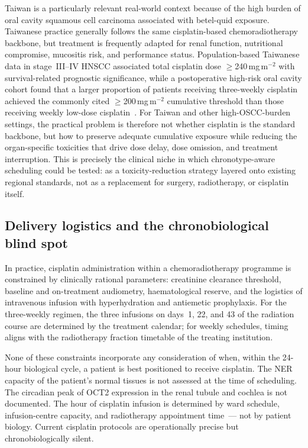 \documentclass[preprint,review,12pt]{elsarticle}
\begin{document}
Taiwan is a particularly relevant real-world context because of the high
burden of oral cavity squamous cell carcinoma associated with betel-quid
exposure.  Taiwanese practice generally follows the same cisplatin-based
chemoradiotherapy backbone, but treatment is frequently adapted for renal
function, nutritional compromise, mucositis risk, and performance status.
Population-based Taiwanese data in stage~III--IV HNSCC associated total
cisplatin dose $\geq$240\,mg\,m$^{-2}$ with survival-related prognostic
significance, while a postoperative high-risk oral cavity cohort found that
a larger proportion of patients receiving three-weekly cisplatin achieved
the commonly cited $\geq$200\,mg\,m$^{-2}$ cumulative threshold than those
receiving weekly low-dose cisplatin~\cite{Chang2017, Tsan2012}.  For Taiwan
and other high-OSCC-burden settings, the practical problem is therefore not
whether cisplatin is the standard backbone, but how to preserve adequate
cumulative exposure while reducing the organ-specific toxicities that drive
dose delay, dose omission, and treatment interruption.  This is precisely
the clinical niche in which chronotype-aware scheduling could be tested:
as a toxicity-reduction strategy layered onto existing regional standards,
not as a replacement for surgery, radiotherapy, or cisplatin itself.

\subsection{Delivery logistics and the chronobiological blind spot}

In practice, cisplatin administration within a chemoradiotherapy programme
is constrained by clinically rational parameters: creatinine clearance
threshold, baseline and on-treatment audiometry, haematological reserve, and
the logistics of intravenous infusion with hyperhydration and antiemetic
prophylaxis. For the three-weekly regimen, the three infusions on days~1, 22,
and 43 of the radiation course are determined by the treatment calendar; for
weekly schedules, timing aligns with the radiotherapy fraction timetable of
the treating institution.

None of these constraints incorporate any consideration of when, within the
24-hour biological cycle, a patient is best positioned to receive cisplatin.
The NER capacity of the patient's normal tissues is not assessed at the time
of scheduling. The circadian peak of OCT2 expression in the renal tubule and
cochlea is not documented. The hour of cisplatin infusion is determined by
ward schedule, infusion-centre capacity, and radiotherapy appointment
time~--- not by patient biology. Current cisplatin protocols are
operationally precise but chronobiologically silent.
\end{document}
